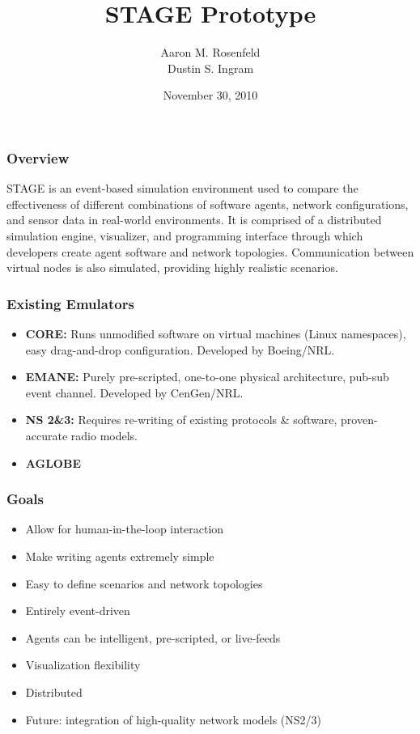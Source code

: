 \documentclass[mathserif]{beamer}
\author{Aaron M. Rosenfeld \\ Dustin S. Ingram}
\title{STAGE Prototype}
\date{November 30, 2010}
\begin{document}
\frame{\titlepage}

\frame
{
    \frametitle{Overview}
    STAGE is an event-based simulation environment used to compare the
    effectiveness of different combinations of software agents, network
    configurations, and sensor data in real-world environments.  It is comprised of
    a distributed simulation engine, visualizer, and programming interface through
    which developers create agent software and network topologies.  Communication
    between virtual nodes is also simulated, providing highly realistic scenarios.
}

\frame
{
    \frametitle{Existing Emulators}

    \begin{itemize}
        \item \textbf{CORE:} Runs unmodified software on virtual machines (Linux namespaces), easy drag-and-drop configuration.  Developed by Boeing/NRL.
        \item \textbf{EMANE:} Purely pre-scripted, one-to-one physical architecture, pub-sub event channel.  Developed by CenGen/NRL.
        \item \textbf{NS 2\&3:} Requires re-writing of existing protocols \& software, proven-accurate radio models.
        \item \textbf{AGLOBE} 
    \end{itemize}
}

\frame
{
    \frametitle{Goals}
    \begin{itemize}
        \item Allow for human-in-the-loop interaction
        \item Make writing agents extremely simple
        \item Easy to define scenarios and network topologies
        \item Entirely event-driven
        \item Agents can be intelligent, pre-scripted, or live-feeds
        \item Visualization flexibility
        \item Distributed
        \item Future: integration of high-quality network models (NS2/3)
    \end{itemize}
}
\end{document}
